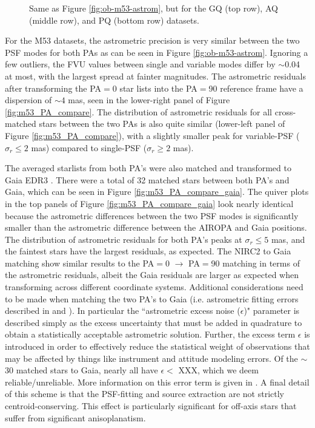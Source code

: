 \documentclass[]{spie}  %
\begin{document}
\begin{figure}[!h]
 \caption{\footnotesize Same as Figure \ref{fig:ob-m53-astrom}, but for the GQ (top row), AQ (middle row), and PQ (bottom row) datasets.} \label{fig:gc-astrom}
\end{figure}

For the M53 datasets, the astrometric precision is very similar between the two PSF modes for both PAs as can be seen in Figure \ref{fig:ob-m53-astrom}. Ignoring a few outliers, the FVU values between single and variable modes differ by ${\sim}$0.04 at most, with the largest spread at fainter magnitudes. The astrometric residuals after transforming the PA$=$0 star lists into the PA$=$90 reference frame have a dispersion of ${\sim}4$ mas, seen in the lower-right panel of Figure \ref{fig:m53_PA_compare}. The distribution of astrometric residuals for all cross-matched stars between the two PAs is also quite similar (lower-left panel of Figure \ref{fig:m53_PA_compare}), with a slightly smaller peak for variable-PSF ($\sigma_{r}\leq2$ mas) compared to single-PSF ($\sigma_{r}\geq2$ mas). 

The averaged starlists from both PA's were also matched and transformed to Gaia EDR3 \citep{brown:2021a}. There were a total of 32 matched stars between both PA's and Gaia, which can be seen in Figure \ref{fig:m53_PA_compare_gaia}. The quiver plots in the top panels of Figure \ref{fig:m53_PA_compare_gaia} look nearly identical because the astrometric differences between the two PSF modes is significantly smaller than the astrometric difference between the AIROPA and Gaia positions. The distribution of astrometric residuals for both PA's peaks at $\sigma_{r}\leq5$ mas, and the faintest stars have the largest residuals, as expected. The NIRC2 to Gaia matching show similar results to the PA$=$0 $\rightarrow$ PA$=$90 matching in terms of the astrometric residuals, albeit the Gaia residuals are larger as expected when transforming across different coordinate systems. Additional considerations need to be made when matching the two PA's to Gaia (i.e. astrometric fitting errors described in \cite{brown:2018a} and \cite{brown:2021a}). In particular the ``astrometric excess noise ($\epsilon$)" parameter is described simply as the excess uncertainty that must be added in quadrature to obtain a statistically acceptable astrometric solution. Further, the excess term $\epsilon$ is introduced in order to effectively reduce the statistical weight of observations that may be affected by things like instrument and attitude modeling errors. Of the ${\sim}$30 matched stars to Gaia, nearly all have $\epsilon < $ XXX, which we deem reliable/unreliable. More information on this error term is given in \cite{lindegren:2012a}. A final detail of this scheme is that the PSF-fitting and source extraction are not strictly centroid-conserving. This effect is particularly significant for off-axis stars that suffer from significant anisoplanatism.
\end{document}
